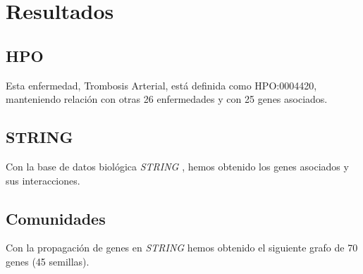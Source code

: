  \newpage
 \section{Resultados}
 
 \subsection{HPO}
 Esta enfermedad, Trombosis Arterial, está definida como HPO:0004420, manteniendo relación con otras 26 enfermedades y con 25 genes asociados.
 
 \subsection{STRING}
 Con la base de datos biológica \textit{STRING} \cite{STRING}, hemos obtenido los genes asociados y sus interacciones.
 
 \begin{minipage}{\linewidth}
 	\label{fig: Figura 3}
 \end{minipage}



\subsection{Comunidades}
Con la propagación de genes en \textit{STRING} hemos obtenido el siguiente grafo de 70 genes (45 semillas).

